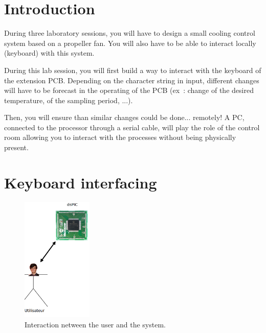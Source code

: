 \documentclass[11pt,a4paper]{article}
\theoremstyle{definition}%
\begin{document}
\section{Introduction}
During three laboratory sessions, you will have to design a small cooling control system based on a propeller fan.
You will also have to be able to interact locally (keyboard) with this system.

During this lab session, you will first build a way to interact with the keyboard of the extension PCB.
Depending on the character string in input, different changes will have to be forecast in the operating of the PCB (ex~: change of the desired temperature, of the sampling period, ...).

Then, you will ensure than similar changes could be done... remotely!
A PC, connected to the processor through a serial cable, will play the role of the control room allowing you to interact with the processes without being physically present.









\section{Keyboard interfacing}
\begin{figure}[H]
\center
\includegraphics[width=0.3\textwidth]{utilisateur}
\caption{Interaction netween the user and the system.}
\label{fig:user}
\end{figure}
\end{document}

